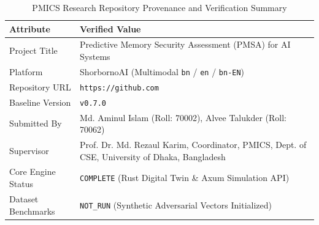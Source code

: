 \begin{table}[h!]
\centering
\caption{PMICS Research Repository Provenance and Verification Summary}
\label{tab:repo_provenance}
\begin{tabular}{|l|p{8.5cm}|}
\hline
\textbf{Attribute} & \textbf{Verified Value} \\ \hline
Project Title & Predictive Memory Security Assessment (PMSA) for AI Systems \\ \hline
Platform & ShorbornoAI (Multimodal \texttt{bn} / \texttt{en} / \texttt{bn-EN}) \\ \hline
Repository URL & \texttt{https://github.com} \\ \hline
Baseline Version & \texttt{v0.7.0} \\ \hline
Submitted By & Md. Aminul Islam (Roll: 70002), Alvee Talukder (Roll: 70062) \\ \hline
Supervisor & Prof. Dr. Md. Rezaul Karim, Coordinator, PMICS, Dept. of CSE, University of Dhaka, Bangladesh \\ \hline
Core Engine Status & \texttt{COMPLETE} (Rust Digital Twin \& Axum Simulation API) \\ \hline
Dataset Benchmarks & \texttt{NOT\_RUN} (Synthetic Adversarial Vectors Initialized) \\ \hline
\end{tabular}
\end{table}
